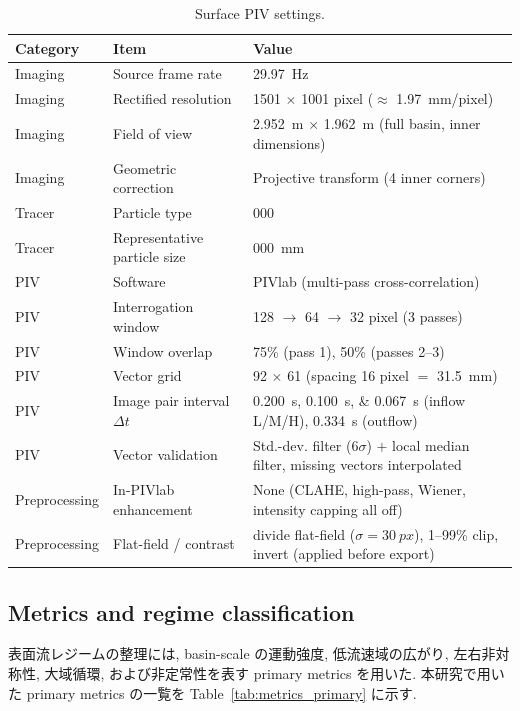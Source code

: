 \begin{table}[tb]
\centering
\caption{Surface PIV settings.}
\label{tab:piv_settings}
\small
\begin{tabular}{lll}
\hline
Category & Item & Value \\
\hline
Imaging & Source frame rate & \SI{29.97}{Hz} \\
Imaging & Rectified resolution & 1501 $\times$ 1001 pixel ($\approx$ \SI{1.97}{mm/pixel}) \\
Imaging & Field of view & \SI{2.952}{m} $\times$ \SI{1.962}{m} (full basin, inner dimensions) \\
Imaging & Geometric correction & Projective transform (4 inner corners) \\
Tracer & Particle type & 000 \\ %
Tracer & Representative particle size & \SI{000}{mm} \\ %
PIV & Software & PIVlab (multi-pass cross-correlation) \\
PIV & Interrogation window & 128 $\rightarrow$ 64 $\rightarrow$ 32 pixel (3 passes) \\
PIV & Window overlap & 75\% (pass 1), 50\% (passes 2--3) \\
PIV & Vector grid & 92 $\times$ 61 (spacing 16 pixel $=$ \SI{31.5}{mm}) \\
PIV & Image pair interval $\Delta t$ & \SIlist{0.200;0.100;0.067}{s} (inflow L/M/H), \SI{0.334}{s} (outflow) \\
PIV & Vector validation & Std.-dev. filter ($6\sigma$) $+$ local median filter, missing vectors interpolated \\
Preprocessing & In-PIVlab enhancement & None (CLAHE, high-pass, Wiener, intensity capping all off) \\
Preprocessing & Flat-field / contrast & divide flat-field ($\sigma=\SI{30}{px}$), 1--99\% clip, invert (applied before export) \\
\hline
\end{tabular}
\end{table}

\subsection{Metrics and regime classification}
\label{sec:methods_metrics}

表面流レジームの整理には, basin-scale の運動強度, 低流速域の広がり, 左右非対称性, 大域循環, および非定常性を表す primary metrics を用いた. 本研究で用いた primary metrics の一覧を Table~\ref{tab:metrics_primary} に示す.

